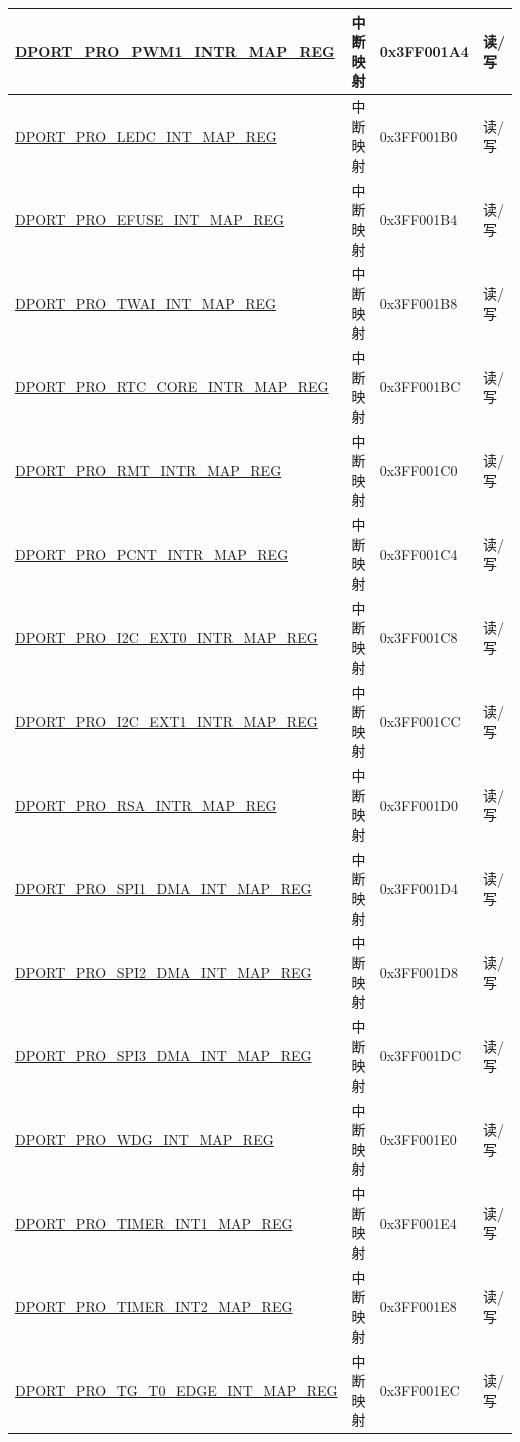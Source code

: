 \begin{longtable}{|L{8.2cm}|L{4.5cm}| l | l | }
\hyperref[regdesc:PROPWM1INTRMAPREG]{DPORT\_PRO\_PWM1\_INTR\_MAP\_REG} & 中断映射 & 0x3FF001A4 & 读/写 \\ \hline
\hyperref[regdesc:PROLEDCINTMAPREG]{DPORT\_PRO\_LEDC\_INT\_MAP\_REG} & 中断映射 & 0x3FF001B0 & 读/写 \\ \hline
\hyperref[regdesc:PROEFUSEINTMAPREG]{DPORT\_PRO\_EFUSE\_INT\_MAP\_REG} & 中断映射 & 0x3FF001B4 & 读/写 \\ \hline
\hyperref[regdesc:PROCANINTMAPREG]{DPORT\_PRO\_TWAI\_INT\_MAP\_REG} & 中断映射 & 0x3FF001B8 & 读/写 \\ \hline
\hyperref[regdesc:PRORTCCOREINTRMAPREG]{DPORT\_PRO\_RTC\_CORE\_INTR\_MAP\_REG} & 中断映射 & 0x3FF001BC & 读/写 \\ \hline
\hyperref[regdesc:PRORMTINTRMAPREG]{DPORT\_PRO\_RMT\_INTR\_MAP\_REG} & 中断映射 & 0x3FF001C0 & 读/写 \\ \hline
\hyperref[regdesc:PROPCNTINTRMAPREG]{DPORT\_PRO\_PCNT\_INTR\_MAP\_REG} & 中断映射 & 0x3FF001C4 & 读/写 \\ \hline
\hyperref[regdesc:PROI2CEXT0INTRMAPREG]{DPORT\_PRO\_I2C\_EXT0\_INTR\_MAP\_REG} & 中断映射 & 0x3FF001C8 & 读/写 \\ \hline
\hyperref[regdesc:PROI2CEXT1INTRMAPREG]{DPORT\_PRO\_I2C\_EXT1\_INTR\_MAP\_REG} & 中断映射 & 0x3FF001CC & 读/写 \\ \hline
\hyperref[regdesc:PRORSAINTRMAPREG]{DPORT\_PRO\_RSA\_INTR\_MAP\_REG} & 中断映射 & 0x3FF001D0 & 读/写 \\ \hline
\hyperref[regdesc:PROSPI1DMAINTMAPREG]{DPORT\_PRO\_SPI1\_DMA\_INT\_MAP\_REG} & 中断映射 & 0x3FF001D4 & 读/写 \\ \hline
\hyperref[regdesc:PROSPI2DMAINTMAPREG]{DPORT\_PRO\_SPI2\_DMA\_INT\_MAP\_REG} & 中断映射 & 0x3FF001D8 & 读/写 \\ \hline
\hyperref[regdesc:PROSPI3DMAINTMAPREG]{DPORT\_PRO\_SPI3\_DMA\_INT\_MAP\_REG} & 中断映射 & 0x3FF001DC & 读/写 \\ \hline
\hyperref[regdesc:PROWDGINTMAPREG]{DPORT\_PRO\_WDG\_INT\_MAP\_REG} & 中断映射 & 0x3FF001E0 & 读/写 \\ \hline
\hyperref[regdesc:PROTIMERINT1MAPREG]{DPORT\_PRO\_TIMER\_INT1\_MAP\_REG} & 中断映射 & 0x3FF001E4 & 读/写 \\ \hline
\hyperref[regdesc:PROTIMERINT2MAPREG]{DPORT\_PRO\_TIMER\_INT2\_MAP\_REG} & 中断映射 & 0x3FF001E8 & 读/写 \\ \hline
\hyperref[regdesc:PROTGT0EDGEINTMAPREG]{DPORT\_PRO\_TG\_T0\_EDGE\_INT\_MAP\_REG} & 中断映射 & 0x3FF001EC & 读/写 \\ \hline

\end{longtable}
